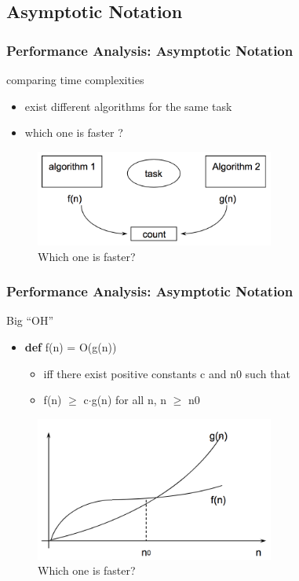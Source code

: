 \documentclass[newPxFont,sthlmFooter,nooffset]{beamer}
\begin{document}
\subsection{Asymptotic Notation}
\begin{frame}[t]
  \frametitle{Performance Analysis: Asymptotic Notation}
comparing time complexities
\begin{itemize}
\item exist different algorithms for the same task
\item which one is faster ?
\end{itemize}
  \begin{figure}[h]
    \centering
    \includegraphics[width=0.7\textwidth]{figures/fig04_asym.png}
    \caption{Which one is faster?}
  \end{figure}
\end{frame}

\begin{frame}[t]
  \frametitle{Performance Analysis: Asymptotic Notation}
Big ``OH''
\begin{itemize}
\item \textbf{def} f(n) = O(g(n))
  \begin{itemize}
  \item iff there exist positive constants c and n0 such that
  \item f(n) $\geq$ c$\cdot$g(n) for all n, n $\geq$ n0
  \end{itemize}
\end{itemize}
  \begin{figure}[h]
    \centering
    \includegraphics[width=0.7\textwidth]{figures/fig05_bigoh.png}
    \caption{Which one is faster?}
  \end{figure}
\end{frame}
\end{document}

